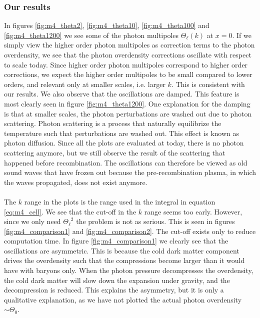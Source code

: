 \documentclass{aa}
\begin{document}
\subsubsection{Our results}
In figures \ref{fig:m4_theta2}, \ref{fig:m4_theta10}, \ref{fig:m4_theta100} and \ref{fig:m4_theta1200} we see some of the photon multipoles
$\Theta_\ell(k)$ at $x=0$. 
If we simply view the higher order photon multipoles as correction terms to the photon
overdensity, we see that the photon overdensity corrections oscillate with respect to scale today. Since higher order photon
multipoles correspond to higher order corrections, we expect the
higher order multipoles to be small compared to lower orders, and relevant only at smaller scales, i.e. larger $k$. This is consistent with our results. We also observe that
the oscillations are damped. This feature is most clearly seen in figure \ref{fig:m4_theta1200}. One explanation for the damping is that at smaller scales, the photon perturbations are washed out due to photon scattering. Photon scattering is a process
that naturally equilibrize the temperature such that perturbations are washed out. This effect is known as photon diffusion. Since all the plots are evaluated at today, 
there is no photon scattering anymore, but we still observe the result of the scattering that happened before recombination. The oscillations can therefore
be viewed as old sound waves that have frozen out because the pre-recombination plasma, in which the waves propagated, does not exist anymore.\\
\\
The $k$ range in the plots is the range used
in the integral in equation \ref{eq:m4_cell}. We see that the cut-off in the $k$ range seems too early. However, since we only need ${\Theta_\ell}^2$ the problem is not
as serious. This is seen in figures \ref{fig:m4_comparison1} and \ref{fig:m4_comparison2}. The cut-off exists only to reduce computation time. 
In figure \ref{fig:m4_comparison1}
we clearly see that the oscillations are asymmetric. This is because the cold dark matter component drives the overdensity such that the compressions become larger than
it would have with baryons only. When the photon pressure decompresses the overdensity, the cold dark matter will slow down the expansion under gravity, and the decompression
is reduced. This explains the asymmetry, but it is only a qualitative explanation, as we have not plotted the actual photon overdensity $\sim \Theta_0$. 
\end{document}
